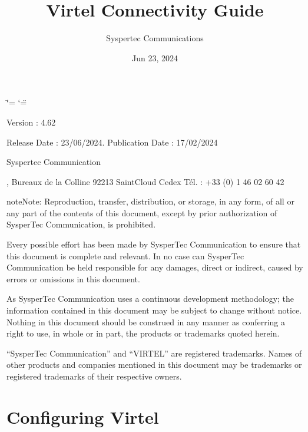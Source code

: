 \documentclass[letterpaper,10pt,english]{sphinxmanual}
\title{Virtel Connectivity Guide}
\date{Jun 23, 2024}
\author{Syspertec Communications}
\begin{document}
\ifdefined\shorthandoff
  \ifnum\catcode`\=\string=\active\shorthandoff{=}\fi
  \ifnum\catcode`\"=\active{}\fi
\fi

\pagestyle{empty}
\sphinxmaketitle
\pagestyle{plain}
\sphinxtableofcontents
\pagestyle{normal}
\label{\detokenize{connectivity_guide::doc}}


\sphinxAtStartPar
{}

\sphinxAtStartPar
{}

\sphinxAtStartPar
Version : 4.62

\sphinxAtStartPar
Release Date : 23/06/2024. Publication Date : 17/02/2024

\sphinxAtStartPar
Syspertec Communication

, Bureaux de la Colline 92213 Saint\sphinxhyphen{}Cloud Cedex Tél. : +33 (0) 1 46 02 60 42

\sphinxAtStartPar
{}

\begin{sphinxadmonition}{note}{Note:}
\sphinxAtStartPar
Reproduction, transfer, distribution, or storage, in any form, of all or any part of
the contents of this document, except by prior authorization of SysperTec
Communication, is prohibited.

\sphinxAtStartPar
Every possible effort has been made by SysperTec Communication to ensure that this document
is complete and relevant. In no case can SysperTec Communication be held responsible for
any damages, direct or indirect, caused by errors or omissions in this document.

\sphinxAtStartPar
As SysperTec Communication uses a continuous development methodology; the information
contained in this document may be subject to change without notice. Nothing in this
document should be construed in any manner as conferring a right to use, in whole or in
part, the products or trademarks quoted herein.

\sphinxAtStartPar
“SysperTec Communication” and “VIRTEL” are registered trademarks. Names of other products
and companies mentioned in this document may be trademarks or registered trademarks of
their respective owners.
\end{sphinxadmonition}


\chapter{Configuring Virtel}
\label{\detokenize{connectivity_guide:configuring-virtel}}\label{\detokenize{connectivity_guide:v462cn-introduction}}
\end{document}
